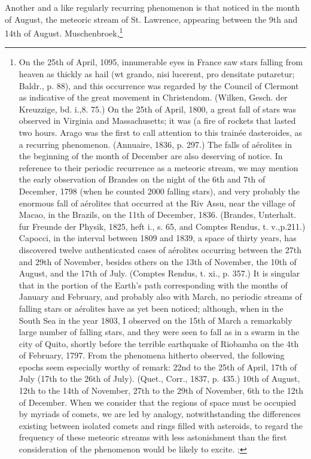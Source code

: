 Another and a like regularly recurring phenomenon is that noticed in the month of August, the meteoric stream of St. Lawrence, appearing between the 9th and 14th of August. Muschenbroek,\footnote{On the 25th of April, 1095, innumerable eyes in France saw stars falling from heaven as thickly as hail (wt grando, nisi lucerent, pro densitate putaretur; Baldr., p. 88), and this occurrence was regarded by the Council of Clermont as indicative of the great movement in Christendom. (Wilken, Gesch. der Kreuzzige, bd. i.,8. 75.) On the 25th of April, 1800, a great fall of stars was observed in Virginia and Massachusetts; it was (a fire of rockets that lasted two hours. Arago was the first to call attention to this train\'{e}e dasteroides, as a recurring phenomenon. (Annuaire, 1836, p. 297.) The falls of a\'{e}rolites in the beginning of the month of December are also deserving of notice. In reference to their periodic recurrence as a meteoric stream, we may mention the early observation of Brandes on the night of the 6th and 7th of December, 1798 (when he counted 2000 falling stars), and very probably the enormous fall of a\'{e}rolites that occurred at the Riv Assu, near the village of Macao, in the Brazils, on the 11th of December, 1836. (Brandes, Unterhalt. fur Freunde der Physik, 1825, heft i., s. 65, and Comptes Rendus, t. v.,p.211.) Capocci, in the interval between 1809 and 1839, a space of thirty years, has discovered twelve authenticated cases of a\'{e}rolites occurring between the 27th and 29th of November, besides others on the 13th of November, the 10th of August, and the 17th of July. (Comptes Rendus, t. xi., p. 357.) It is singular that in the portion of the Earth's path corresponding with the months of January and February, and probably also with March, no periodic streams of falling stars or a\'{e}rolites have as yet been noticed; although, when in the South Sea in the year 1803, I observed on the 15th of March a remarkably large number of falling stars, and they were seen to fall as in a swarm in the city of Quito, shortly before the terrible earthquake of Riobamba on the 4th of February, 1797. From the phenomena hitherto observed, the following epochs seem especially worthy of remark: 22nd to the 25th of April, 17th of July (17th to the 26th of July). (Quet., Corr., 1837, p. 435.) 10th of August, 12th to the 14th of November, 27th to the 29th of November, 6th to the 12th of December. When we consider that the regions of space must be occupied by myriads of comets, we are led by analogy, notwithstanding the differences existing between isolated comets and rings filled with asteroids, to regard the frequency of these meteoric streams with less astonishment than the first consideration of the phenomenon would be likely to excite. ;
}
